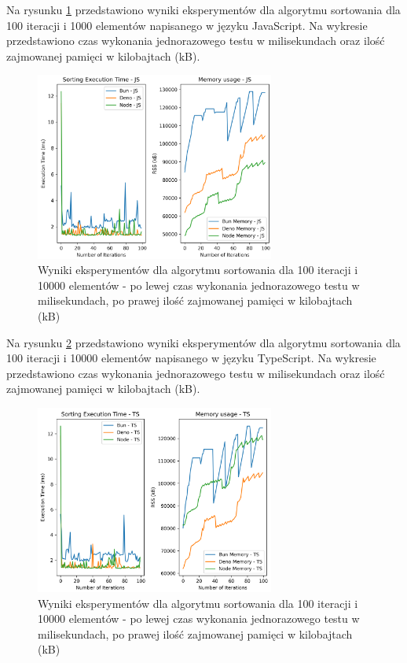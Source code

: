 Na rysunku \ref{fig:radix_sorting_e2} przedstawiono wyniki eksperymentów dla algorytmu sortowania  dla 100 iteracji i 1000 elementów napisanego w języku JavaScript. Na wykresie przedstawiono czas wykonania jednorazowego testu w milisekundach oraz ilość zajmowanej pamięci w kilobajtach (kB).

\begin{figure}[H]
  \centering
  \includegraphics[width=0.7\textwidth]{Figures/sorting/sorting_radix_100_10000_js.png}
  \caption{Wyniki eksperymentów dla algorytmu sortowania  dla 100 iteracji i 10000 elementów - po lewej czas wykonania jednorazowego testu w milisekundach, po prawej ilość zajmowanej pamięci w kilobajtach (kB)}
  \label{fig:radix_sorting_e2}
\end{figure}

Na rysunku \ref{fig:radix_sorting_e2_ts} przedstawiono wyniki eksperymentów dla algorytmu sortowania  dla 100 iteracji i 10000 elementów napisanego w języku TypeScript. Na wykresie przedstawiono czas wykonania jednorazowego testu w milisekundach oraz ilość zajmowanej pamięci w kilobajtach (kB).

\begin{figure}[H]
  \centering
  \includegraphics[width=0.7\textwidth]{Figures/sorting/sorting_radix_100_10000_ts.png}
  \caption{Wyniki eksperymentów dla algorytmu sortowania  dla 100 iteracji i 10000 elementów - po lewej czas wykonania jednorazowego testu w milisekundach, po prawej ilość zajmowanej pamięci w kilobajtach (kB)}
  \label{fig:radix_sorting_e2_ts}
\end{figure}

